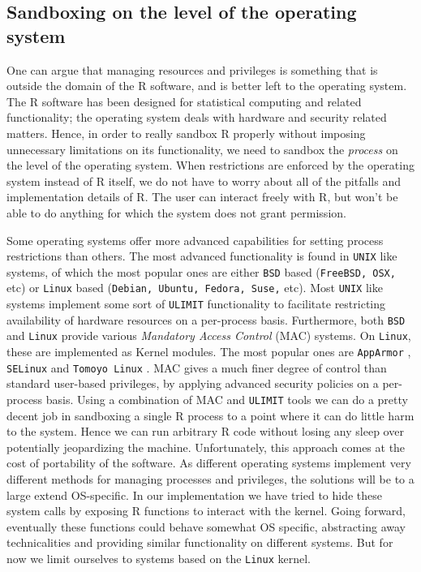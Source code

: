 \documentclass{jss}
\newcommand{\R}{\textsf{R}\xspace}
\newcommand{\AppArmor}{\texttt{AppArmor}\xspace}
\newcommand{\Linux}{\texttt{Linux}\xspace}
\newcommand{\ULIMIT}{\texttt{ULIMIT}\xspace}
\begin{document}
\subsection{Sandboxing on the level of the operating system}

One can argue that managing resources and privileges is something that is
outside the domain of the \R software, and is better left to the operating
system. The \R software has been designed for statistical computing and related
functionality; the operating system deals with hardware and security related
matters. Hence, in order to really sandbox \R properly without imposing
unnecessary limitations on its functionality, we need to sandbox the
\emph{process} on the level of the operating system. When restrictions are
enforced by the operating system instead of \R itself, we do not have to worry
about all of the pitfalls and implementation details of \R. The user can
interact freely with \R, but won't be able to do anything for which the system
does not grant permission.

Some operating systems offer more advanced capabilities for setting process
restrictions than others. The most advanced functionality is found in
\texttt{UNIX} like systems, of which the most popular ones are either
\texttt{BSD} based (\texttt{FreeBSD, OSX,} etc) or \Linux based (\texttt{Debian,
Ubuntu, Fedora, Suse,} etc). Most \texttt{UNIX} like systems implement some sort
of \ULIMIT functionality to facilitate restricting availability of hardware
resources on a per-process basis. Furthermore, both \texttt{BSD} and \Linux
provide various \emph{Mandatory Access Control} (MAC) systems. On \Linux, these
are implemented as Kernel modules. The most popular ones are \AppArmor
\citep{apparmor}, \texttt{SELinux} \citep{selinux} and \texttt{Tomoyo Linux}
\citep{tomoyo}. MAC gives a much finer degree of control than standard
user-based privileges, by applying advanced security policies on a per-process
basis. Using a combination of MAC and \ULIMIT tools we can do a pretty decent
job in sandboxing a single \R process to a point where it can do little harm to
the system. Hence we can run arbitrary \R code without losing any sleep over
potentially jeopardizing the machine. Unfortunately, this approach comes at the
cost of portability of the software. As different operating systems implement
very different methods for managing processes and privileges, the solutions
will be to a large extend OS-specific. In our implementation we have tried to
hide these system calls by exposing \R functions to interact with the kernel.
Going forward, eventually these functions could behave somewhat OS specific,
abstracting away technicalities and providing similar functionality on
different systems. But for now we limit ourselves to systems based on the
\Linux kernel.
\end{document}
